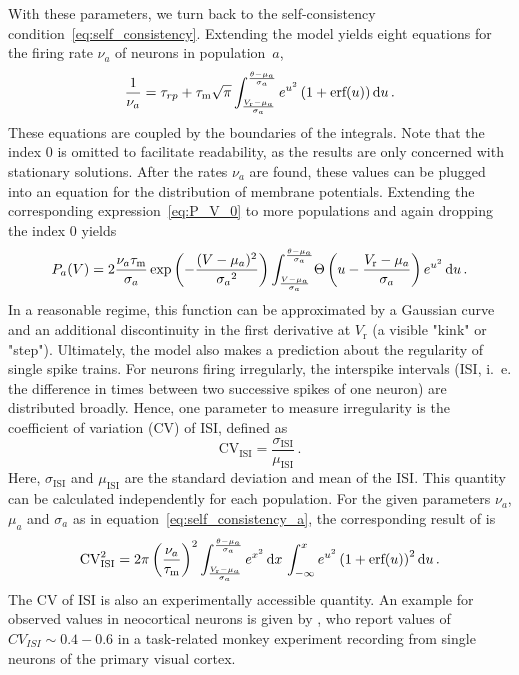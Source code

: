 With these parameters, we turn back to the self-consistency 
condition~\eqref{eq:self_consistency}. Extending the model yields eight equations for the 
firing rate $\nu_a$ of neurons in population~$a$, 
\begin{equation}
    \frac{1}{\nu_{a}} = \tau_{rp} 
        + \tau_\text{m} \sqrt{\pi}
            \int_{\frac{V_\text{r} - \mu_{a}}{\sigma_{a}}}^{\frac{\theta - \mu_{a}}{\sigma_{a}}} 
                e^{u^2} \left(1 + \text{erf}(u)\right) \mathop{}\!\text{d} u  \,.
    \label{eq:self_consistency_a}
\end{equation}
These equations are coupled by the boundaries of the integrals. Note that the index $0$ 
is omitted to facilitate readability, as the results are only concerned with stationary
solutions. After the rates $\nu_a$ are found, these values can be 
plugged into an equation for the distribution of membrane potentials. Extending the 
corresponding expression~\eqref{eq:P_V_0} to more populations and again dropping the 
index $0$ yields
\begin{equation}
    P_a(V) = 2 \frac{\nu_a \tau_\text{m}}{\sigma_a} 
        \exp{\left(- \frac{(V - \mu_a)^2}{{\sigma_a}^2} \right)}
        \int_{\frac{V - \mu_a}{\sigma_a}}^{\frac{\theta - \mu_a}{\sigma_a}} \! 
            \Theta \left(u - \frac{V_\text{r} - \mu_a}{\sigma_a} \right) e^{u^2} \mathop{}\!\text{d} u  \,.
    \label{eq:P_V_a}
\end{equation}
In a reasonable regime, this function can be approximated by a Gaussian curve and an 
additional discontinuity in the first 
derivative at $V_\text{r}$ (a visible "kink" or "step").
Ultimately, the model also makes a prediction about the regularity of single spike 
trains. For neurons firing irregularly, the interspike intervals
(ISI, i.~e. the difference in times between two successive spikes of one neuron) 
are distributed broadly. Hence, one parameter to measure irregularity is the coefficient 
of variation (CV) of ISI, defined as
\begin{equation}
    \text{CV}_\text{ISI} = \frac{\sigma_\text{ISI}}{\mu_\text{ISI}} \,.
    \label{eq:cv_isi}
\end{equation}
Here, $\sigma_\text{ISI}$ and $\mu_\text{ISI}$ are the standard deviation and mean of 
the ISI. This quantity can be calculated
independently for each population. For the given parameters $\nu_a$, $\mu_a$ and 
$\sigma_a$ as in equation~\eqref{eq:self_consistency_a}, the corresponding 
result of  is
\begin{equation}
    \text{CV}_\text{ISI}^2 
        = 2 \pi \left(\frac{\nu_a}{\tau_\text{m}}\right)^2
            \int_{\frac{V_\text{r} - \mu_{a}}{\sigma_{a}}}^{\frac{\theta - \mu_{a}}{\sigma_{a}}} 
            e^{x^2}  \,\text{d}x  \,
            \int_{-\infty}^{x} 
            e^{u^2} \left(1 + \text{erf}(u)\right)^2 \mathop{}\!\text{d} u  \,.
    \label{eq:CV_ISI_mf}
\end{equation}
The CV of ISI is also an experimentally accessible quantity. An example for observed 
values in neocortical neurons is given by , who report values
of $CV_{ISI} \sim 0.4 - 0.6$ in a task-related monkey experiment recording from 
single neurons of the primary visual cortex.

